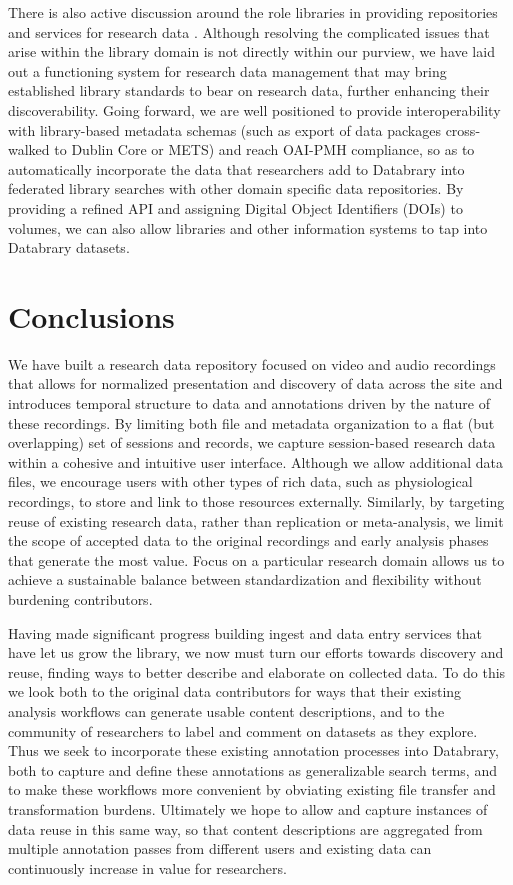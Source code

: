 \documentclass{sig-alternate}
\begin{document}
There is also active discussion around the role libraries in providing repositories and services for research data \cite{Castelli_etal_2013,Nielson_Hjørland_2014,Macmillan_2014,Pinfield_etal_2014}.
Although resolving the complicated issues that arise within the library domain is not directly within our purview, we have laid out a functioning system for research data management that may bring established library standards to bear on research data, further enhancing their discoverability.
Going forward, we are well positioned to provide interoperability with library-based metadata schemas (such as export of data packages cross-walked to Dublin Core or METS) and reach OAI-PMH compliance, so as to automatically incorporate the data that researchers add to Databrary into federated library searches with other domain specific data repositories.
By providing a refined API and assigning Digital Object Identifiers (DOIs) to volumes, we can also allow libraries and other information systems to tap into Databrary datasets.

\section{Conclusions}

We have built a research data repository focused on video and audio recordings that allows for normalized presentation and discovery of data across the site and introduces temporal structure to data and annotations driven by the nature of these recordings.
By limiting both file and metadata organization to a flat (but overlapping) set of sessions and records, we capture session-based research data within a cohesive and intuitive user interface.
Although we allow additional data files, we encourage users with other types of rich data, such as physiological recordings, to store and link to those resources externally.
Similarly, by targeting reuse of existing research data, rather than replication or meta-analysis, we limit the scope of accepted data to the original recordings and early analysis phases that generate the most value.
Focus on a particular research domain allows us to achieve a sustainable balance between standardization and flexibility without burdening contributors.

Having made significant progress building ingest and data entry services that have let us grow the library, we now must turn our efforts towards discovery and reuse, finding ways to better describe and elaborate on collected data.
To do this we look both to the original data contributors for ways that their existing analysis workflows can generate usable content descriptions, and to the community of researchers to label and comment on datasets as they explore.
Thus we seek to incorporate these existing annotation processes into Databrary, both to capture and define these annotations as generalizable search terms, and to make these workflows more convenient by obviating existing file transfer and transformation burdens.
Ultimately we hope to allow and capture instances of data reuse in this same way, so that content descriptions are aggregated from multiple annotation passes from different users and existing data can continuously increase in value for researchers.
\end{document}
